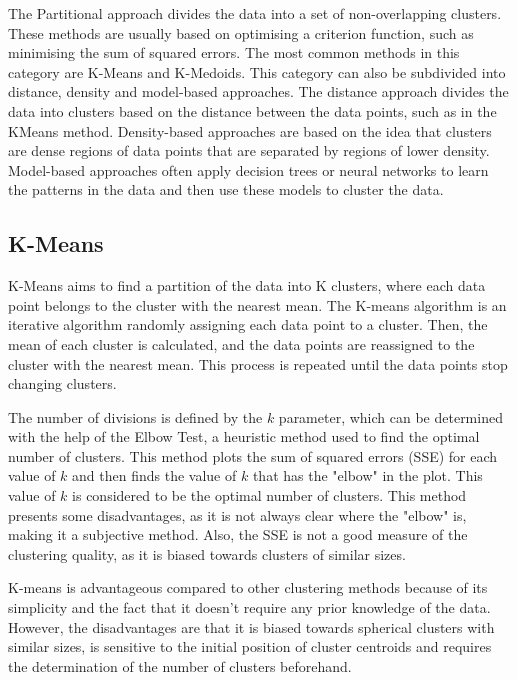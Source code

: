 The Partitional approach divides the data into a set of non-overlapping clusters. These methods are usually based on optimising a criterion function, such as minimising the sum of squared errors. The most common methods in this category are K-Means and K-Medoids. This category can also be subdivided into distance, density and model-based approaches. The distance approach divides the data into clusters based on the distance between the data points, such as in the KMeans method. Density-based approaches are based on the idea that clusters are dense regions of data points that are separated by regions of lower density. Model-based approaches often apply decision trees or neural networks to learn the patterns in the data and then use these models to cluster the data. \cite{Saxena.Prasad.ea_reviewclusteringtechniques_2017}


\subsection{K-Means}\label{sec:kmeans} 
K-Means aims to find a partition of the data into K clusters, where each data point belongs to the cluster with the nearest mean. The K-means algorithm is an iterative algorithm randomly assigning each data point to a cluster. Then, the mean of each cluster is calculated, and the data points are reassigned to the cluster with the nearest mean. This process is repeated until the data points stop changing clusters. 

The number of divisions is defined by the $k$ parameter, which can be determined with the help of the Elbow Test, a heuristic method used to find the optimal number of clusters. This method plots the sum of squared errors (SSE) for each value of $k$ and then finds the value of $k$ that has the "elbow" in the plot. This value of $k$ is considered to be the optimal number of clusters. This method presents some disadvantages, as it is not always clear where the "elbow" is, making it a subjective method. Also, the SSE is not a good measure of the clustering quality, as it is biased towards clusters of similar sizes.

K-means is advantageous compared to other clustering methods because of its simplicity and the fact that it doesn't require any prior knowledge of the data. However, the disadvantages are that it is biased towards spherical clusters with similar sizes, is sensitive to the initial position of cluster centroids and requires the determination of the number of clusters beforehand.


